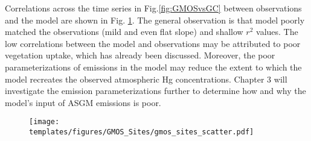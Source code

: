 \begin{table}[H]
\label{tab:model_percentage_overestimation_of_mean}

\center
{}
\end{table}


\begin{flushleft}
 Correlations across the time series in Fig.\ref{fig:GMOSvsGC} between observations and the model are shown in Fig. \ref{fig:gmos_sites_scatter}. The general observation is that model poorly matched the observations (mild and even flat slope)  and shallow $r^2$ values. The low correlations between the model and observations may be attributed to poor vegetation uptake, which has already been discussed\cite{feinberg_evaluating_2022}. Moreover, the poor parameterizations of emissions in the model may reduce the extent to which the model recreates the observed atmospheric Hg concentrations. Chapter 3 will investigate the emission parameterizations further to determine how and why the model's input of ASGM emissions is poor. 
\end{flushleft}
 \begin{figure}[H]
\texttt{[image: templates/figures/GMOS\_Sites/gmos\_sites\_scatter.pdf]}
\centering
{}
\label{fig:gmos_sites_scatter}
\end{figure}
\FloatBarrier


